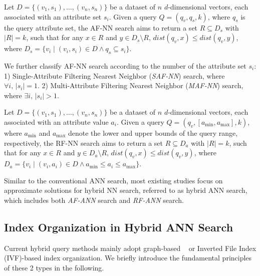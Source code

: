 \documentclass[sigconf, nonacm]{acmart}
\begin{document}
\begin{definition}[AF-NN Search]
Let \( D = \{(v_1, s_1), \ldots, (v_n, s_n)\} \) be a dataset of \( n \) \( d \)-dimensional vectors, each associated with an attribute set \( s_i \). Given a query \( Q = (q_v, q_s, k) \), where \( q_s \) is the query attribute set, the AF-NN search aims to return a set \( R \subseteq D_s \) with \( |R| = k \), such that for any \( x \in R \) and \( y \in D_s \setminus R \), \( \textit{dist}(q_v, x) \leq \textit{dist}(q_v, y) \), where \( D_s = \{ v_i \mid (v_i, s_i) \in D \land q_s \subseteq s_i \} \).
\end{definition}

We further classify AF-NN search according to the number of the attribute set \( s_i \): 1) Single-Attribute Filtering Nearest Neighbor (\textit{SAF-NN}) search, where $\forall i,\, |s_i| = 1$. 2) Multi-Attribute Filtering Nearest Neighbor (\textit{MAF-NN}) search, where $\exists i,\, |s_i| > 1$.

\begin{definition}[RF-NN Search]

Let \( D = \{(v_1, s_1), \ldots, (v_n, s_n)\} \) be a dataset of \( n \) \( d \)-dimensional vectors, each associated with an attribute value \( a_i \). Given a query \( Q = (q_v, [a_{\min}, a_{\max}], k) \), where \( a_{\min} \) and \( a_{\max} \) denote the lower and upper bounds of the query range, respectively, the RF-NN search aims to return a set \( R \subseteq D_a \) with \( |R| = k \), such that for any \( x \in R \) and \( y \in D_a \setminus R \), \( \textit{dist}(q_v, x) \leq \textit{dist}(q_v, y) \), where \( D_a = \{ v_i \mid (v_i, a_i) \in D \land a_{\min} \leq a_i \leq a_{\max} \} \).
\end{definition}



Similar to the conventional ANN search, most existing studies focus on approximate solutions for hybrid NN search, referred to as hybrid ANN search, which includes both \textit{AF-ANN} search and \textit{RF-ANN} search.



\subsection{Index Organization in Hybrid ANN Search}

Current hybrid query methods mainly adopt graph-based ~\cite{nsw,kgraph,nsg,fanng,ngt} or Inverted File Index (IVF)-based \cite{PQ} index organization. We briefly introduce the fundamental principles of these 2 types in the following.
\end{document}
